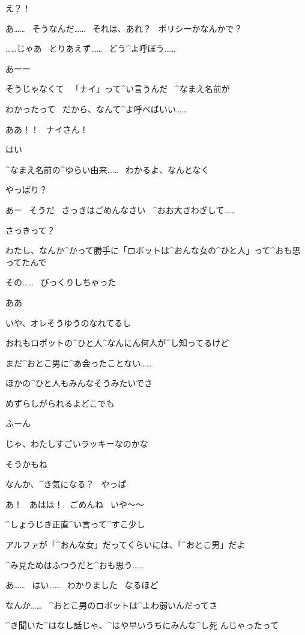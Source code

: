 \Alpha え？！

\Alpha あ……
\ そうなんだ……
\ それは、あれ？
\ ポリシーかなんかで？

\Alpha ……じゃあ
\ とりあえず……
\ どう^{よ}{呼}ぼう……

\Nai あーー

\page
\Nai そうじゃなくて
\ 「ナイ」って^{い}{言}うんだ
\ ^{なまえ}{名前}が

\Alpha わかったって
\ だから、なんて^{よ}{呼}べばいい……

\Alpha ああ！！
\ ナイさん！

\Nai はい

\Alpha ^{なまえ}{名前}の^{ゆらい}{由来}……
\ わかるよ、なんとなく

\Nai やっぱり？

\page
\Alpha あー
\ そうだ
\ さっきはごめんなさい
\ ^{おお}{大}さわぎして……

\Nai さっきって？

\Alpha わたし、なんか^{かって}{勝手}に「ロボットは^{おんな}{女}の^{ひと}{人}」って^{おも}{思}ってたんで

\Alpha その……
\ びっくりしちゃった

\Nai ああ

\Nai いや、オレそうゆうのなれてるし

\page
\Nai おれもロボットの^{ひと}{人}^{なんにん}{何人}が^{し}{知}ってるけど

\Nai まだ^{おとこ}{男}に^{あ}{会}ったことない……

\Nai ほかの^{ひと}{人}もみんなそうみたいでさ

\Nai めずらしがられるよどこでも

\Alpha ふーん

\Alpha じゃ、わたしすごいラッキーなのかな

\Nai そうかもね

\page
\Nai なんか、^{き}{気}になる？
\ やっぱ

\Alpha あ！
\ あはは！
\ ごめんね
\ いや〜〜

\Alpha ^{しょうじき}{正直}^{い}{言}って^{すこ}{少}し

\Nai アルファが「^{おんな}{女}」だってくらいには、「^{おとこ}{男}」だよ

\Nai ^{み}{見}ためはふつうだと^{おも}{思}う……

\Alpha あ……
\ はい……
\ わかりました
\ なるほど

\page
\Nai なんか……
\ ^{おとこ}{男}のロボットは^{よわ}{弱}いんだってさ

\Nai ^{き}{聞}いた^{はなし}{話}じゃ、^{はや}{早}いうちにみんな^{し}{死}
んじゃったって

